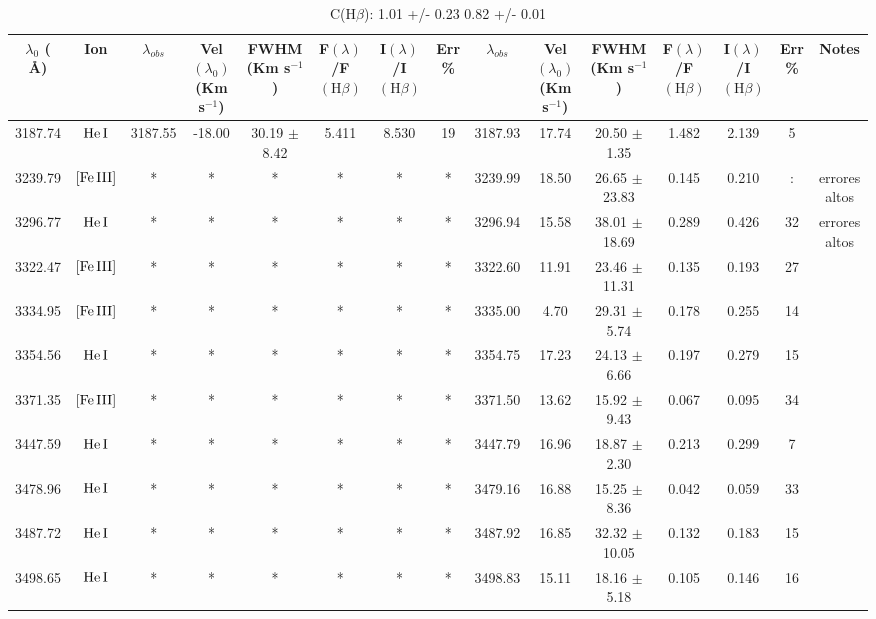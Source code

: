 \documentclass{article}
\begin{document}
\begin{table*}
\caption{C(H$\beta$): 1.01 +/- 0.23 0.82 +/- 0.01 } 
\begin{adjustbox}{width=\textwidth}
\label{}
\begin{tabular}{ccccccccccccccc} 
\hline
$\lambda_0$ ( \AA ) & Ion & $\lambda_{obs}$ & Vel$\left( \lambda_0 \right)$ (Km s$^{-1}$) & FWHM (Km s$^{-1}$) & F$\left( \lambda \right)$/F$\left( \mbox{H}\beta \right)$ & I$\left( \lambda \right)$/I$\left( \mbox{H}\beta \right)$ & Err \% & $\lambda_{obs}$ & Vel$\left( \lambda_0 \right)$ (Km s$^{-1}$) & FWHM (Km s$^{-1}$) & F$\left( \lambda \right)$/F$\left( \mbox{H}\beta \right)$ & I$\left( \lambda \right)$/I$\left( \mbox{H}\beta \right)$ & Err \% & Notes \\
\hline
3187.74 & $\mbox{He}\thinspace \mbox{I}$ & 3187.55 & -18.00 & 30.19 $\pm$ 8.42 & 5.411 & 8.530 & 19 & 3187.93 & 17.74 & 20.50 $\pm$ 1.35 & 1.482 & 2.139 & 5 &  \\
3239.79 & $\mbox{[Fe}\thinspace \mbox{III]}$ & * & * & * & * & * & * & 3239.99 & 18.50 & 26.65 $\pm$ 23.83 & 0.145 & 0.210 & : &  errores altos \\
3296.77 & $\mbox{He}\thinspace \mbox{I}$ & * & * & * & * & * & * & 3296.94 & 15.58 & 38.01 $\pm$ 18.69 & 0.289 & 0.426 & 32 &  errores altos \\
3322.47 & $\mbox{[Fe}\thinspace \mbox{III]}$ & * & * & * & * & * & * & 3322.60 & 11.91 & 23.46 $\pm$ 11.31 & 0.135 & 0.193 & 27 &  \\
3334.95 & $\mbox{[Fe}\thinspace \mbox{III]}$ & * & * & * & * & * & * & 3335.00 & 4.70 & 29.31 $\pm$ 5.74 & 0.178 & 0.255 & 14 &  \\
3354.56 & $\mbox{He}\thinspace \mbox{I}$ & * & * & * & * & * & * & 3354.75 & 17.23 & 24.13 $\pm$ 6.66 & 0.197 & 0.279 & 15 &  \\
3371.35 & $\mbox{[Fe}\thinspace \mbox{III]}$ & * & * & * & * & * & * & 3371.50 & 13.62 & 15.92 $\pm$ 9.43 & 0.067 & 0.095 & 34 &  \\
3447.59 & $\mbox{He}\thinspace \mbox{I}$ & * & * & * & * & * & * & 3447.79 & 16.96 & 18.87 $\pm$ 2.30 & 0.213 & 0.299 & 7 &  \\
3478.96 & $\mbox{He}\thinspace \mbox{I}$ & * & * & * & * & * & * & 3479.16 & 16.88 & 15.25 $\pm$ 8.36 & 0.042 & 0.059 & 33 &  \\
3487.72 & $\mbox{He}\thinspace \mbox{I}$ & * & * & * & * & * & * & 3487.92 & 16.85 & 32.32 $\pm$ 10.05 & 0.132 & 0.183 & 15 &  \\
3498.65 & $\mbox{He}\thinspace \mbox{I}$ & * & * & * & * & * & * & 3498.83 & 15.11 & 18.16 $\pm$ 5.18 & 0.105 & 0.146 & 16 &  \\

\end{tabular}
\end{adjustbox}
\end{table*}
\end{document}
